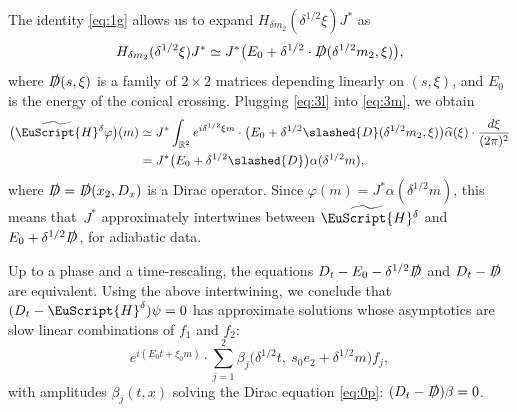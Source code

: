 \documentclass[JEP,XML,SOM,Unicode,NoFloatCountersInSection]{cedram}
\let\pazocal\EuScript
\theoremstyle{definition}
\newcommand{\HH}{\pazocal{H}}
\newcommand{\tHH}{\widetilde{\HH}{}}
\newcommand{\R}{\mathbb{R}}
\let\az\alpha
\let\vp\varphi
\newcommand{\haz}{{\widehat{\az}}}
\newcommand{\Di}{\slashed{D}}
\begin{document}
The identity \eqref{eq:1g} allows us to expand $H_{\delta m_2}(\delta^{1/2} \xi) J^*$ as
\begin{equation}\label{eq:3l}
H_{\delta m_2}(\delta^{1/2} \xi) J^* \simeq J^* \bigl( E_0 + \delta^{1/2} \cdot \Di(\delta^{1/2} m_2, \xi) \bigr),
\end{equation}
where $\Di(s,\xi)$ is a family of $2 \times 2$ matrices depending linearly on $(s,\xi)$, and $E_0$ is the energy of the conical crossing. Plugging \eqref{eq:3l} into \eqref{eq:3m}, we obtain
\begin{align*}
\bigl(\tHH^\delta \vp \bigr)(m) &\simeq J^*\int_{\R^2} e^{i\delta^{1/2} \xi m} \cdot \bigl( E_0 + \delta^{1/2} \Di(\delta^{1/2} m_2, \xi) \bigr) \haz(\xi) \cdot \dfrac{d\xi}{(2\pi )^2}\\
&= J^* \bigl( E_0 + \delta^{1/2} \Di\bigr) \az (\delta^{1/2} m),
\end{align*}
where $\Di = \Di(x_2, D_x)$ is a Dirac operator. Since $\vp(m) = J^*\az(\delta^{1/2}m)$, this means that~$J^*$ approximately intertwines between $\tHH^\delta$ and $E_0 + \delta^{1/2} \Di$, for adiabatic data.

Up to a phase and a time-rescaling, the equations $D_t - E_0 - \delta^{1/2} \Di$ and $D_t - \Di$ are equivalent. Using the above intertwining, we conclude that
$(D_t-\HH^\delta) \psi = 0$ has approximate solutions whose asymptotics are slow linear combinations of $f_1$ and $f_2$:
\begin{equation*}
e^{i(E_0 t + \xi_0 m)} \cdot \sum_{j=1}^2 \beta_j\bigl( \delta^{1/2} t, \ s_0 e_2 + \delta^{1/2} m \bigr) f_j,
\end{equation*}
with amplitudes $\beta_j(t,x)$ solving the Dirac equation \eqref{eq:0p}: $(D_t - \Di) \beta = 0$.

\backmatter


\end{document}
